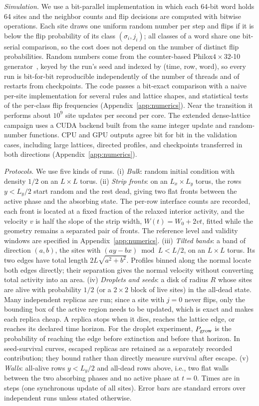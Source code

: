 \documentclass[pre,twocolumn,superscriptaddress,showpacs,floatfix]{revtex4-2}
\begin{document}
\textit{Simulation.} We use a bit-parallel implementation in which each 64-bit word holds 64
sites and the neighbor counts and flip decisions are computed with bitwise operations. Each site
draws one uniform random number per step and flips if it is below the flip probability of its
class $(\sigma_i, j_i)$; all classes of a word share one bit-serial comparison, so the cost does
not depend on the number of distinct flip probabilities. Random numbers come from the
counter-based Philox$4\times 32$-10 generator~\cite{salmon2011}, keyed by the run's seed and
indexed by (time, row, word), so every run is bit-for-bit reproducible independently of the
number of threads and of restarts from checkpoints. The code passes a bit-exact comparison with a
naive per-site implementation for several rules and lattice shapes, and statistical tests of
the per-class flip frequencies (Appendix~\ref{app:numerics}). Near the transition it performs
about $10^9$ site updates per second per core. The extended dense-lattice
campaign uses a CUDA backend built from the same integer update and random-number
functions. CPU and GPU outputs agree bit for bit in the validation cases,
including large lattices, directed profiles, and checkpoints transferred in
both directions (Appendix~\ref{app:numerics}).

\textit{Protocols.} We use five kinds of runs.
(i) \emph{Bulk}: random initial condition with density $1/2$ on an $L\times L$ torus.
(ii) \emph{Strip fronts}: on an $L_x\times L_y$ torus, the rows $y<L_y/2$ start random and the
rest dead, giving two flat fronts between the active phase and the absorbing state. The per-row
interface counts are recorded, each front is located at a fixed fraction of
the relaxed interior activity, and the velocity $v$ is half the slope of the
strip width, $W(t) = W_0 + 2vt$,
fitted while the geometry remains a separated pair of fronts. The reference
level and validity windows are specified in Appendix~\ref{app:numerics}.
(iii) \emph{Tilted bands}: a band of direction $(a,b)$, the sites with
$(a y - b x)\bmod L < L/2$, on an $L\times L$ torus. Its two edges have total length
$2L\sqrt{a^2+b^2}$. Profiles binned along the normal locate both edges directly;
their separation gives the normal velocity without converting total activity
into an area.
(iv) \emph{Droplets and seeds}: a disk of radius $R$ whose sites are alive with probability $1/2$
(or a $2\times 2$ block of live sites) in the all-dead state. Many independent replicas are run;
since a site with $j = 0$ never flips, only the bounding box of the active region needs to be
updated, which is exact and makes each replica cheap. A replica stops when it
dies, reaches the lattice edge, or reaches its declared time horizon.
For the droplet experiment, $P_{\rm grow}$ is the probability of reaching
the edge before extinction and before that horizon. In seed-survival curves,
escaped replicas are retained as a separately recorded contribution; they
bound rather than directly measure survival after escape.
(v) \emph{Walls}: all-alive rows $y<L_y/2$ and all-dead rows above, i.e., two flat walls between
the two absorbing phases and no active phase at $t = 0$.
Times are in steps (one synchronous update of all sites). Error bars are standard errors over
independent runs unless stated otherwise.
\end{document}
